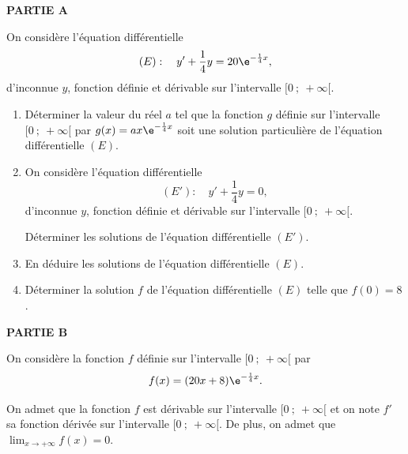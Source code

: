 \medskip

\textbf{PARTIE A}

\medskip

On considère l'équation différentielle 
\[(E) : \quad y' +\dfrac14y = 20\e^{-\frac14 x},\]
d'inconnue $y$, fonction définie et dérivable sur l'intervalle $[0~;~ +\infty[$.

\medskip

\begin{enumerate}
\item Déterminer la valeur du réel $a$ tel que la fonction $g$ définie sur l'intervalle $[0~;~ +\infty[$ par $g(x) = ax\e^{-\frac14 x}$ soit une solution particulière de l'équation différentielle $(E)$.

\item On considère l'équation différentielle 
\[(E') : \quad y' +\dfrac14 y = 0,\]
d'inconnue $y$, fonction définie et dérivable sur l'intervalle $[0~;~ +\infty[$.

Déterminer les solutions de l'équation différentielle $(E')$.
\item En déduire les solutions de l'équation différentielle $(E)$.
\item Déterminer la solution $f$ de l'équation différentielle $(E)$ telle que $f(0) = 8$.
\end{enumerate}

\medskip

\textbf{PARTIE B}

\medskip

On considère la fonction $f$ définie sur l'intervalle $[0~;~ +\infty[$ par 
\[f(x) = (20x + 8)\e^{-\frac14 x}.\]

On admet que la fonction $f$ est dérivable sur l'intervalle $[0~;~ +\infty[$ et on note $f'$ sa fonction dérivée sur l'intervalle $[0~;~ +\infty[$. De plus, on admet que $\displaystyle\lim_{x \to + \infty}f(x) = 0$.

\medskip

